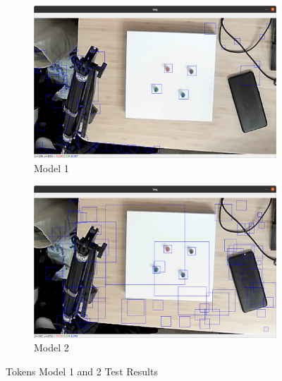 \documentclass[12pt]{article}
\begin{document}
\begin{figure}[H]
    \centering
    \begin{subfigure}{1\textwidth}
        \includegraphics[width=\textwidth]{images/figures/app2a}
        \caption{Model 1}
        \label{fig:tokens1}
    \end{subfigure}
    \begin{subfigure}{1\textwidth}
        \includegraphics[width=\textwidth]{images/figures/app2b}
        \caption{Model 2}
        \label{fig:tokens2}
    \end{subfigure}
    \caption{Tokens Model 1 and 2 Test Results}
    \label{fig:main}
\end{figure}
\end{document}

